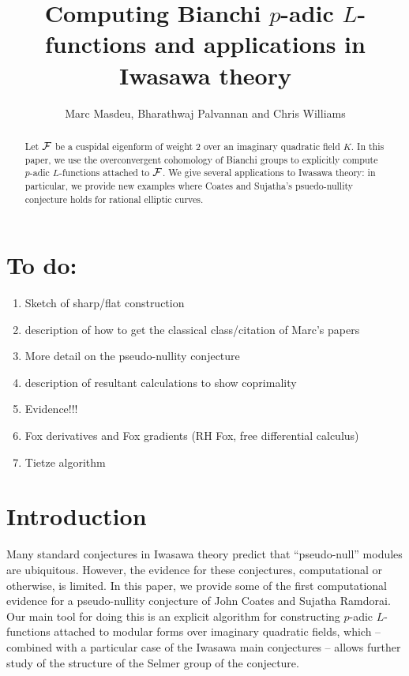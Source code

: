 \documentclass[a4paper,11pt]{article}
\title{Computing Bianchi $p$-adic $L$-functions and applications in Iwasawa theory}
\author{Marc Masdeu, Bharathwaj Palvannan and Chris Williams}
\date{}
\numberwithin{equation}{section}
\begin{document}
%
%

\maketitle


\begin{abstract}
	Let $\mathcal{F}$ be a cuspidal eigenform of weight 2 over an imaginary quadratic field $K$. In this paper, we use the overconvergent cohomology of Bianchi groups to explicitly compute $p$-adic $L$-functions attached to $\mathcal{F}$. We give several applications to Iwasawa theory: in particular, we provide new examples where Coates and Sujatha's psuedo-nullity conjecture holds for rational elliptic curves.%
\end{abstract}

\section*{To do:}

\begin{enumerate}
    \item Sketch of sharp/flat construction
    \item description of how to get the classical class/citation of Marc's papers
    \item More detail on the pseudo-nullity conjecture
    \item description of resultant calculations to show coprimality
    \item Evidence!!!
    \item Fox derivatives and Fox gradients (RH Fox, free differential calculus)
    \item Tietze algorithm
\end{enumerate}
\section{Introduction}

Many standard conjectures in Iwasawa theory predict that ``pseudo-null'' modules are ubiquitous. However, the evidence for these conjectures, computational or otherwise, is limited. In this paper, we provide some of the first computational evidence for a pseudo-nullity conjecture of John Coates and Sujatha Ramdorai. Our main tool for doing this is an explicit algorithm for constructing $p$-adic $L$-functions attached to modular forms over imaginary quadratic fields, which -- combined with a particular case of the Iwasawa main conjectures -- allows further study of the structure of the Selmer group of the conjecture.
\end{document}
